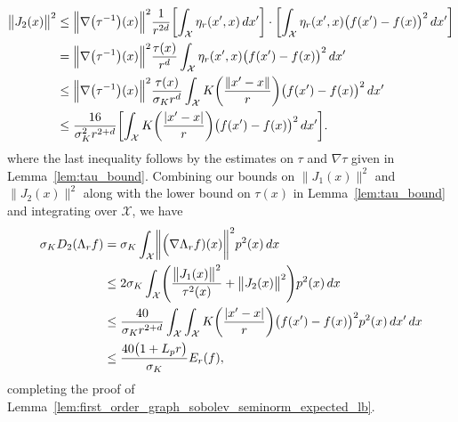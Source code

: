 \documentclass[twoside]{article}
\newcommand{\1}{\mathbf{1}}
\newcommand{\Xset}{\mathcal{X}}
\theoremstyle{definition}
\theoremstyle{remark}
\begin{document}
\begin{align*}
\bigl\|J_2(x)\bigr\|^2 & \leq \Bigl\|\nabla\bigl(\tau^{-1}\bigr)(x)\Bigr\|^2\frac{1}{r^{2d}} \biggl[\int_{\Xset}\eta_r(x',x) \,dx'\biggr] \cdot \biggl[\int_{\Xset} \eta_r(x',x)\bigl(f(x') - f(x)\bigr)^2 \,dx' \biggr] \\
& = \Bigl\|\nabla\bigl(\tau^{-1}\bigr)(x)\Bigr\|^2\frac{\tau(x)}{r^d} \int_{\Xset} \eta_r(x',x)\bigl(f(x') - f(x)\bigr)^2 \,dx'\\ 
& \leq \Bigl\|\nabla\bigl(\tau^{-1}\bigr)(x)\Bigr\|^2\frac{\tau(x)}{\sigma_K r^d}\int_{\Xset} K\biggl(\frac{\|x' - x\|}{r}\biggr)\bigl(f(x') - f(x)\bigr)^2 \,dx' \\
& \leq \frac{16}{\sigma_K^2r^{2 + d}} \biggl[\int_{\Xset} K\biggl(\frac{|x' - x|}{r}\biggr)\bigl(f(x') - f(x)\bigr)^2 \,dx' \biggr].
\end{align*}
where the last inequality follows by the estimates on $\tau$ and $\nabla \tau$ given in Lemma~\ref{lem:tau_bound}. Combining our bounds on $\bigl\|J_1(x)\bigr\|^2$ and $\bigl\|J_2(x)\bigr\|^2$ along with the lower bound on $\tau(x)$ in Lemma~\ref{lem:tau_bound} and integrating over $\Xset$, we have
\begin{align*}
\sigma_K D_2(\Lambda_r f) & = \sigma_K\int_{\Xset} \biggl\|\Bigl(\nabla \Lambda_rf)(x)\biggr\|^2 p^2(x) \,dx \\
& \leq 2 \sigma_K \int_{\Xset} \Biggl(\frac{\bigl\|J_1(x)\bigr\|^2}{\tau^2(x)} + \bigl\|J_2(x)\bigr\|^2\Biggr) p^2(x) \,dx \\
& \leq \frac{40}{\sigma_K r^{2 + d}} \int_{\Xset} \int_{\Xset} K\biggl(\frac{|x' - x|}{r}\biggr)\bigl(f(x') - f(x)\bigr)^2 p^2(x) \,dx' \,dx \\
& \leq \frac{40 \bigl(1 + L_p r\bigr)}{\sigma_K} E_r(f),
\end{align*}
completing the proof of Lemma~\ref{lem:first_order_graph_sobolev_seminorm_expected_lb}. 
\end{document}
